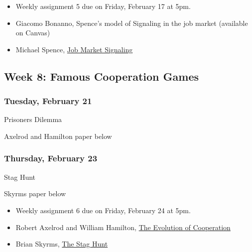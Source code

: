\documentclass[
]{article}
\providecommand{\tightlist}{%
  \setlength{\itemsep}{0pt}\setlength{\parskip}{0pt}}
\begin{document}
\begin{itemize}
\tightlist
\item
  Weekly assignment 5 due on Friday, February 17 at 5pm.
\item
  Giacomo Bonanno, Spence's model of Signaling in the job market
  (available on Canvas)
\item
  Michael Spence, \href{https://www.jstor.org/stable/1882010?seq=1}{Job
  Market Signaling}
\end{itemize}

\newpage

\hypertarget{week-8-famous-cooperation-games}{%
\subsection{Week 8: Famous Cooperation
Games}\label{week-8-famous-cooperation-games}}

\begin{multicols}{2}

\hypertarget{tuesday-february-21}{%
\subsubsection{Tuesday, February 21}\label{tuesday-february-21}}

\begin{description}
\tightlist
\item[Topic]
Prisoners Dilemma
\item[Reading]
Axelrod and Hamilton paper below
\end{description}

\hypertarget{thursday-february-23}{%
\subsubsection{Thursday, February 23}\label{thursday-february-23}}

\begin{description}
\tightlist
\item[Topic]
Stag Hunt
\item[Reading]
Skyrms paper below
\end{description}

\end{multicols}

\begin{itemize}
\tightlist
\item
  Weekly assignment 6 due on Friday, February 24 at 5pm.
\item
  Robert Axelrod and William Hamilton,
  \href{http://www-personal.umich.edu/~axe/research/Axelrod\%20and\%20Hamilton\%20EC\%201981.pdf}{The
  Evolution of Cooperation}
\item
  Brian Skyrms, \href{https://www.jstor.org/stable/3218711}{The Stag
  Hunt}
\end{itemize}
\end{document}

